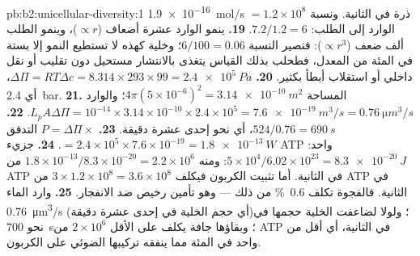 \begin{solution}{pb:b2:unicellular-diversity:1}
\qty{1.9e-16}{mol/s} $= 1.2\times 10^8$ ذرة في الثانية. ونسبة الوارد
إلى الطلب: $7.2/1.2 = 6$.
\textbf{19.} ينمو الوارد عشرة أضعاف ($\propto r$)، وينمو الطلب ألف
ضعف ($\propto r^3$): فتصير النسبة $6/100 = 0.06$؛ وخلية كهذه لا
تستطيع النمو إلا بستة في المئة من المعدل، فطحلب بذلك القياس يتغذى
بالانتشار مستحيل دون تقليب أو نقل داخلي أو استقلاب أبطأ بكثير.
\textbf{20.} $\Delta\Pi = RT\Delta c = 8.314\times 293\times 99 =
\qty{2.4e5}{Pa}$، أي \qty{2.4}{bar}.
\textbf{21.} المساحة $4\pi(5\times 10^{-6})^2 = \qty{3.14e-10}{m^2}$؛
والوارد $L_p A\Delta\Pi = 10^{-14}\times 3.14\times 10^{-10}\times
2.4\times 10^5 = \qty{7.6e-19}{m^3/s} = \qty{0.76}{\micro m^3/s}$.
\textbf{22.} $524/0.76 = \qty{690}{s}$، أي نحو إحدى عشرة دقيقة.
\textbf{23.} $P = \Delta\Pi\times$ التدفق $= 2.4\times 10^5\times
7.6\times 10^{-19} = \qty{1.8e-13}{W}$.
\textbf{24.} جزيء ATP واحد: $5\times 10^4/6.02\times 10^{23} =
\qty{8.3e-20}{J}$: ومنه $1.8\times 10^{-13}/8.3\times 10^{-20} = 2.2\times
10^6$ من ATP في الثانية. أما تثبيت الكربون فيكلف $3\times 1.2\times 10^8 =
3.6\times 10^8$ من ATP في الثانية. فالفجوة تكلف \qty{0.6}{\%} من
ذلك --- وهو تأمين رخيص ضد الانفجار.
\textbf{25.} وارد الماء \qty{0.76}{\micro m^3/s} (أي حجم الخلية
في إحدى عشرة دقيقة)؛ ولولا  لضاعفت الخلية حجمها في نحو
\qty{700}{s}؛ وبقاؤها جافة يكلف على الأقل
$2\times 10^6$ من ATP في الثانية، أي أقل من واحد في المئة مما ينفقه
تركيبها الضوئي على الكربون.
\end{solution}
